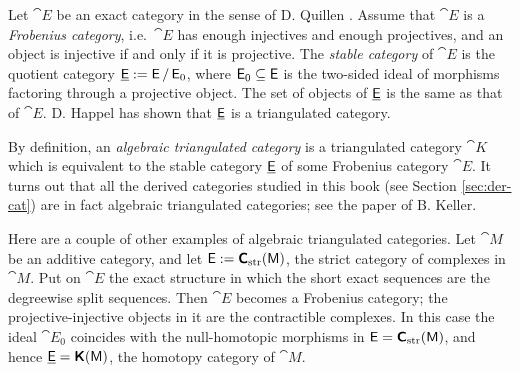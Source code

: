 \begin{rem} \label{rem:4911}
Let $\cat{E}$ be an exact category in the sense of D. Quillen \cite{Qu1}. 
Assume that $\cat{E}$ is a {\em Frobenius category}, i.e.\ $\cat{E}$ has 
enough injectives and enough projectives, and an object is injective if and only 
if it is projective. The 
{\em stable category}%
of $\cat{E}$ is the 
quotient category $\underline{\operatorname{\mathsf{E}}} := \operatorname{\mathsf{E}} / \operatorname{\mathsf{E}}_0$, where 
$\operatorname{\mathsf{E}}_0 \subseteq \operatorname{\mathsf{E}}$ is the two-sided ideal of morphisms 
factoring through a projective object. The set of objects of $\underline{\operatorname{\mathsf{E}}}$ is 
the same as that of $\cat{E}$. D. Happel \cite{Hap0} has shown that 
$\underline{\operatorname{\mathsf{E}}}$ is 
a triangulated category. 

By definition, an {\em algebraic triangulated category} is a 
triangulated category $\cat{K}$ which is equivalent to the stable category 
$\underline{\operatorname{\mathsf{E}}}$ of some Frobenius category $\cat{E}$.
It turns out that all the derived categories studied in this book
(see Section \ref{sec:der-cat}) are in fact 
algebraic triangulated categories; see the paper \cite{Kel0} of B. Keller. 

Here are a couple of other examples of algebraic triangulated categories. 
Let $\cat{M}$ be an additive category, and let 
$\operatorname{\mathsf{E}} := \boldsymbol{\mathsf{C}}_{\mathrm{str}}(\operatorname{\mathsf{M}})$, the strict category of complexes in 
$\cat{M}$. Put on $\cat{E}$ the exact structure in which the short exact 
sequences are the degreewise split sequences. Then $\cat{E}$ becomes a 
Frobenius category; the projective-injective objects in it are the contractible 
complexes. In this case the ideal $\cat{E}_0$ coincides with the null-homotopic 
morphisms in $\operatorname{\mathsf{E}} = \boldsymbol{\mathsf{C}}_{\mathrm{str}}(\operatorname{\mathsf{M}})$, and hence 
$\underline{\operatorname{\mathsf{E}}} = \boldsymbol{\mathsf{K}}(\operatorname{\mathsf{M}})$, the homotopy category of $\cat{M}$. 


\end{rem}

